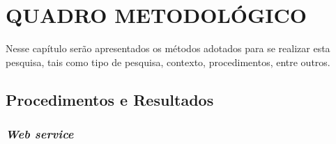 \chapter{QUADRO METODOLÓGICO}

	\par Nesse capítulo serão apresentados os métodos adotados para se realizar esta
pesquisa, tais como tipo de pesquisa, contexto, procedimentos, entre outros.
	
	
	
	
	\section{Procedimentos e Resultados}
		
	
	
	
			\subsection{\textit{Web service}}	
				
	
